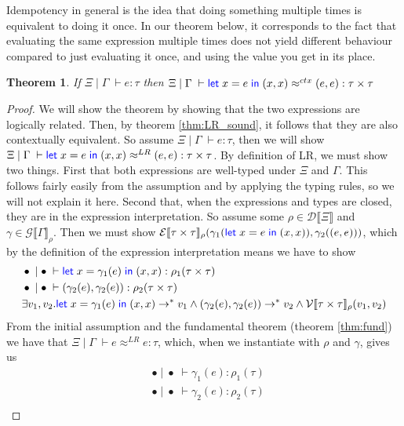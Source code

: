 \documentclass[twoside,11pt,openright]{report}
\newtheorem{theorem}{Theorem}
\theoremstyle{definition}
\newcommand{\var}{x}
\newcommand{\expr}{e}
\newcommand{\val}{v}
\newcommand{\Tprod}[2]{#1 \times #2}
\newcommand{\typ}{\tau}
\newcommand{\venv}{\Gamma}
\newcommand{\tenv}{\Xi}
\newcommand{\emptenv}{\bullet}
\newcommand{\empvenv}{\bullet}
\newcommand{\jdg}[4]{#1 \; | \; #2 \; \vdash #3 : #4}
\newcommand{\jdgRel}[6]{#1 \; | \; #2 \; \vdash #3 \approx^{#4} #5 : #6}
\newcommand{\ctxRel}[5]{\jdgRel{#1}{#2}{#3}{ctx}{#4}{#5}}
\newcommand{\stepS}{\rightarrow^*}
\newcommand{\ValInp}[2]{\mathcal{V} \llbracket #1 \rrbracket_{#2}}
\newcommand{\ValInpGen}[2]{\ValInp{#1}{#2}(\val_1, \val_2)}
\newcommand{\ExpInp}[2]{\mathcal{E} \llbracket #1 \rrbracket_{#2}}
\newcommand{\VenvInp}[2]{\mathcal{G} \llbracket #1 \rrbracket_{#2}}
\newcommand{\TenvInp}[1]{\mathcal{D} \llbracket #1 \rrbracket}
\newcommand{\LogRel}[5]{\jdgRel{#1}{#2}{#3}{LR}{#4}{#5}}
\begin{document}
Idempotency in general is the idea that doing something multiple times is equivalent to doing it once. In our theorem below, it corresponds to the fact that evaluating the same expression multiple times does not yield different behaviour compared to just evaluating it once, and using the value you get in its place.
\begin{theorem}
  If $\jdg{\tenv}{\venv}{\expr}{\typ}$ then $\ctxRel{\tenv}{\venv}{\Let \var = \expr in (\var, \var)}{(\expr, \expr)}{\Tprod{\typ}{\typ}}$
\end{theorem}
\begin{proof}
  We will show the theorem by showing that the two expressions are logically related. Then, by theorem \ref{thm:LR_sound}, it follows that they are also contextually equivalent. So assume $\jdg{\tenv}{\venv}{\expr}{\typ}$, then we will show $\LogRel{\tenv}{\venv}{\Let \var = \expr in (\var, \var)}{(\expr, \expr)}{\Tprod{\typ}{\typ}}$. By definition of LR, we must show two things. First that both expressions are well-typed under $\tenv$ and $\venv$. This follows fairly easily from the assumption and by applying the typing rules, so we will not explain it here. Second that, when the expressions and types are closed, they are in the expression interpretation. So assume some $\rho \in \TenvInp{\tenv}$ and $\gamma \in \VenvInp{\venv}{\rho}$. Then we must show $\ExpInp{\Tprod{\typ}{\typ}}{\rho}(\gamma_1(\Let \var = \expr in (\var, \var)), \gamma_2((\expr, \expr)))$, which by the definition of the expression interpretation means we have to show
  \begin{align}
    &\jdg{\emptenv}{\empvenv}{\Let \var = \gamma_1(\expr) in (\var, \var)}{\rho_1(\Tprod{\typ}{\typ})}\label{idem:goal_1.1}\\
    &\jdg{\emptenv}{\empvenv}{(\gamma_2(\expr), \gamma_2(\expr))}{\rho_2(\Tprod{\typ}{\typ})}\label{idem:goal_1.2}\\
    &\exists \val_1, \val_2 . \Let \var = \gamma_1(\expr) in (\var, \var) \stepS \val_1 \land (\gamma_2(\expr), \gamma_2(\expr)) \stepS \val_2 \land\ValInpGen{\Tprod{\typ}{\typ}}{\rho}\label{idem:goal_1.3}
  \end{align}
  From the initial assumption and the fundamental theorem (theorem \ref{thm:fund}) we have that $\LogRel{\tenv}{\venv}{\expr}{\expr}{\typ}$, which, when we instantiate with $\rho$ and $\gamma$, gives us 
  \begin{align}
    &\jdg{\emptenv}{\empvenv}{\gamma_1(\expr)}{\rho_1(\typ)}\label{idem:1.1}\\
    &\jdg{\emptenv}{\empvenv}{\gamma_2(\expr)}{\rho_2(\typ)}\label{idem:1.2}\\

\end{align}
\end{proof}
\end{document}
